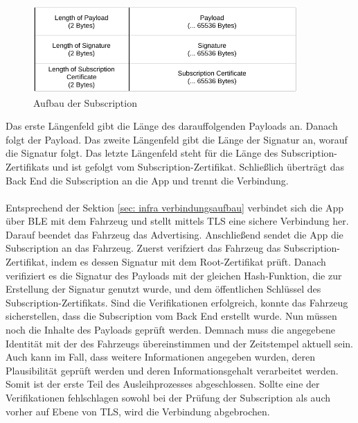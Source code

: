 \begin{figure}[H]
    \centering
    \includegraphics[width=0.9\textwidth]{graphics/aufbau_subscription.pdf}
    \caption[Aufbau der Subscription]{Aufbau der Subscription}
    \label{fig: aufbau subscription}
\end{figure}
Das erste Längenfeld gibt die Länge des darauffolgenden Payloads an. Danach folgt der Payload. Das zweite Längenfeld gibt die Länge der Signatur an, worauf die Signatur folgt. Das letzte Längenfeld steht für die Länge des Subscription-Zertifikats und ist gefolgt vom Subscription-Zertifikat. Schließlich überträgt das Back End die Subscription an die App und trennt die Verbindung.
\\\\
Entsprechend der Sektion \ref{sec: infra verbindungsaufbau} verbindet sich die App über BLE mit dem Fahrzeug und stellt mittels TLS eine sichere Verbindung her. Darauf beendet das Fahrzeug das Advertising. Anschließend sendet die App die Subscription an das Fahrzeug. Zuerst verifziert das Fahrzeug das Subscription-Zertifikat, indem es dessen Signatur mit dem Root-Zertifikat prüft. Danach verifiziert es die Signatur des Payloads mit der gleichen Hash-Funktion, die zur Erstellung der Signatur genutzt wurde, und dem öffentlichen Schlüssel des Subscription-Zertifikats. Sind die Verifikationen erfolgreich, konnte das Fahrzeug sicherstellen, dass die Subscription vom Back End erstellt wurde. Nun müssen noch die Inhalte des Payloads geprüft werden. Demnach muss die angegebene Identität mit der des Fahrzeugs übereinstimmen und der Zeitstempel aktuell sein. Auch kann im Fall, dass weitere Informationen angegeben wurden, deren Plausibilität geprüft werden und deren Informationsgehalt verarbeitet werden. Somit ist der erste Teil des Ausleihprozesses abgeschlossen. Sollte eine der Verifikationen fehlschlagen sowohl bei der Prüfung der Subscription als auch vorher auf Ebene von TLS, wird die Verbindung abgebrochen.